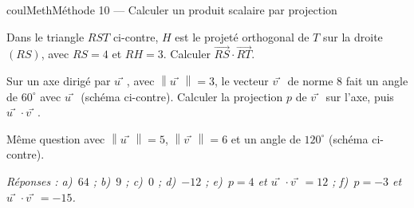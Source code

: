 \documentclass[11pt,a4paper]{article}
\makeatletter
\newcommand{\vect}[1]{\overrightarrow{#1}}
\newcommand{\norme}[1]{\left\lVert #1 \right\rVert}
\newcommand{\pt}[3]{\path (#1) node[croix]{} node[#2,font=\small,inner sep=2.5pt]{$#3$};}
\newcounter{lycee@signet}
\newcommand{\signet}[3][]{\stepcounter{lycee@signet}%
  \edef\lycee@dest{\if\relax\detokenize{#1}\relax
    signet.\arabic{lycee@signet}\else#1\fi}%
  \hypertarget{\lycee@dest}{}\bookmark[level=#2,dest=\lycee@dest]{#3}}
\def\vec#1{#1⃗}}%
\newcounter{methode}
\newenvironment{methodebox}[1][Méthode]{\stepcounter{methode}%
  \begin{boitecours}[phantom={\signet[methode-\arabic{methode}]{2}{#1}}]{coulMeth}{#1}}%
  {\end{boitecours}}
\newcommand{\reponse}[1]{\par\smallskip
  {\footnotesize\itshape\color{black!55}Réponses : #1}}
\makeatother
\begin{document}
\begin{methodebox}[Méthode 10 --- Calculer un produit scalaire par projection]
\smallskip
\begin{minipage}[t]{0.58\linewidth}\raggedright
\begin{questions}[label=\alph*),start=4]
  \item Dans le triangle $RST$ ci-contre, $H$ est le projeté orthogonal de $T$ sur la
        droite $(RS)$, avec $RS=4$ et $RH=3$. Calculer $\vect{RS}\cdot\vect{RT}$.
\end{questions}
\end{minipage}\hfill
\begin{minipage}[t]{0.38\linewidth}
\vspace{0pt}\centering
{}
\end{minipage}

\smallskip
\begin{minipage}[t]{0.58\linewidth}\raggedright
\begin{questions}[label=\alph*),start=5]
  \item Sur un axe dirigé par $\vec{u}$, avec $\norme{\vec{u}}=3$, le vecteur $\vec{v}$
        de norme $8$ fait un angle de $60^{\circ}$ avec $\vec{u}$ (schéma ci-contre).
        Calculer la projection $p$ de $\vec{v}$ sur l'axe, puis $\vec{u}\cdot\vec{v}$.
\end{questions}
\end{minipage}\hfill
\begin{minipage}[t]{0.38\linewidth}
\vspace{0pt}\centering
{}
\end{minipage}

\smallskip
\begin{minipage}[t]{0.58\linewidth}\raggedright
\begin{questions}[label=\alph*),start=6]
  \item Même question avec $\norme{\vec{u}}=5$, $\norme{\vec{v}}=6$ et un angle de
        $120^{\circ}$ (schéma ci-contre).
\end{questions}
\end{minipage}\hfill
\begin{minipage}[t]{0.38\linewidth}
\vspace{0pt}\centering
{}
\end{minipage}
\reponse{a)~$64$ ;\; b)~$9$ ;\; c)~$0$ ;\; d)~$-12$ ;\; e)~$p=4$ et
$\vec{u}\cdot\vec{v}=12$ ;\; f)~$p=-3$ et $\vec{u}\cdot\vec{v}=-15$.}
\end{methodebox}
\end{document}
